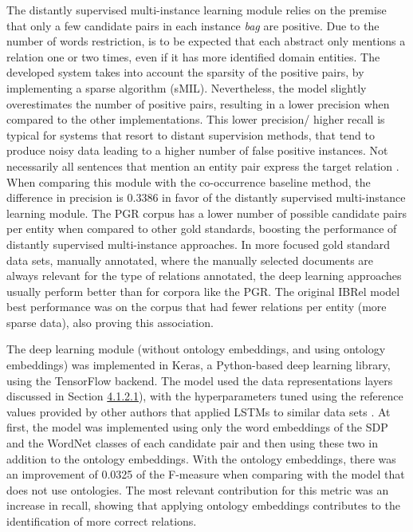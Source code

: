 The distantly supervised multi-instance learning module relies on the premise that only a few candidate pairs in each instance \textit{bag} are positive. Due to the number of words restriction, is to be expected that each abstract only mentions a relation one or two times, even if it has more identified domain entities. The developed system takes into account the sparsity of the positive pairs, by implementing a sparse algorithm (sMIL). Nevertheless, the model slightly overestimates the number of positive pairs, resulting in a lower precision when compared to the other implementations. This lower precision/ higher recall is typical for systems that resort to distant supervision methods, that tend to produce noisy data leading to a higher number of false positive instances. Not necessarily all sentences that mention an entity pair express the target relation \citep{jiang-etal-2018-revisiting}. When comparing this module with the co-occurrence baseline method, the difference in precision is 0.3386 in favor of the distantly supervised multi-instance learning module. The PGR corpus has a lower number of possible candidate pairs per entity when compared to other gold standards, boosting the performance of distantly supervised multi-instance approaches. In more focused gold standard data sets, manually annotated, where the manually selected documents are always relevant for the type of relations annotated, the deep learning approaches usually perform better than for corpora like the PGR. The original IBRel model best performance was on the corpus that had fewer relations per entity (more sparse data), also proving this association. 

The deep learning module (without ontology embeddings, and using ontology embeddings) was implemented in Keras, a Python-based deep learning library, using the TensorFlow backend. The model used the data representations layers discussed in Section \hyperlink{4.1.2.1}{4.1.2.1}), with the hyperparameters tuned using the reference values provided by other authors that applied LSTMs to similar data sets \citep{SAHU201815}. At first, the model was implemented using only the word embeddings of the SDP and the WordNet classes of each candidate pair and then using these two in addition to the ontology embeddings. With the ontology embeddings, there was an improvement of 0.0325 of the F-measure when comparing with the model that does not use ontologies. The most relevant contribution for this metric was an increase in recall, showing that applying ontology embeddings contributes to the identification of more correct relations. 

